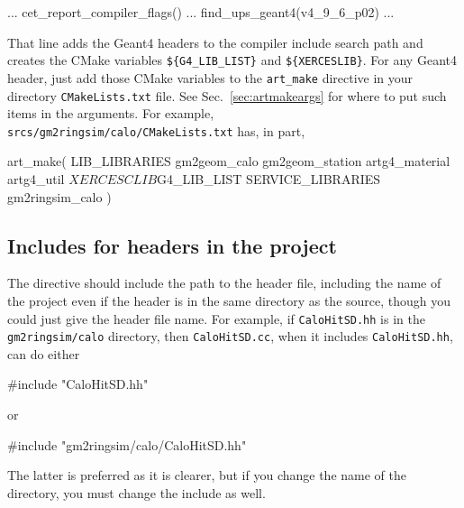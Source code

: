 \begin{cpplisting}
  ...
  cet_report_compiler_flags()
  ...
  find_ups_geant4(v4_9_6_p02)
  ...
\end{cpplisting}

That line adds the Geant4 headers to the compiler include search path
and creates the CMake variables \texttt{\$\{G4\_LIB\_LIST\}} and
\texttt{\$\{XERCESLIB\}}. For any Geant4 header, just add those CMake
variables to the \texttt{art\_make} directive in your directory
\texttt{CMakeLists.txt} file. See Sec.~\ref{sec:artmakeargs} for where
to put such items in the arguments. For example,\\ \noindent
\texttt{srcs/gm2ringsim/calo/CMakeLists.txt} has, in part,

\begin{cpplisting}
  art_make( 
      LIB_LIBRARIES
          gm2geom_calo
          gm2geom_station
          artg4_material
          artg4_util
          ${XERCESCLIB}
          ${G4_LIB_LIST}
      SERVICE_LIBRARIES
          gm2ringsim_calo
        )
\end{cpplisting}

\subsection{Includes for headers in the project}
\label{sec:incl-head-proj}

The  directive should include the path to the header
file, including the name of the project even if the header is in the
same directory as the source, though you could just give the header
file name. For example, if \texttt{CaloHitSD.hh} is in the
\texttt{gm2ringsim/calo} directory, then \texttt{CaloHitSD.cc}, when it includes \texttt{CaloHitSD.hh}, can do either

\begin{cpplisting}
 #include "CaloHitSD.hh"
\end{cpplisting}

or

\begin{cpplisting}
 #include "gm2ringsim/calo/CaloHitSD.hh"
\end{cpplisting}

The latter is preferred as it is clearer, but if you change the name
of the directory, you must change the include as well.


